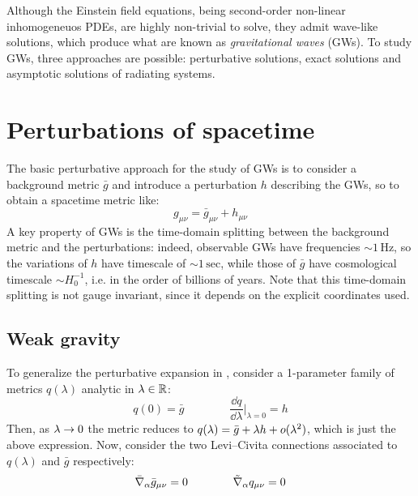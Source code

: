 
Although the Einstein field equations, being second-order non-linear inhomogeneuos PDEs, are highly non-trivial to solve, they admit wave-like solutions, which produce what are known as \emph{gravitational waves} (GWs). To study GWs, three approaches are possible: perturbative solutions, exact solutions and asymptotic solutions of radiating systems.

\section{Perturbations of spacetime}

The basic perturbative approach for the study of GWs is to consider a background metric $ \bar{g} $ and introduce a perturbation $ h $ describing the GWs, so to obtain a spacetime metric like:
\begin{equation}
  g_{\mu \nu} = \bar{g}_{\mu \nu} + h_{\mu \nu}
  \label{eq:gw-pert-exp}
\end{equation}
A key property of GWs is the time-domain splitting between the background metric and the perturbations: indeed, observable GWs have frequencies $ \sim 1 \,\text{Hz} $, so the variations of $ h $ have timescale of $ \sim 1 \,\text{sec} $, while those of $ \bar{g} $ have cosmological timescale $ \sim H_0^{-1} $, i.e. in the order of billions of years. Note that this time-domain splitting is not gauge invariant, since it depends on the explicit coordinates used.

\subsection{Weak gravity}
\label{ssec:weak-gravity}

To generalize the perturbative expansion in , consider a 1-parameter family of metrics $ q(\lambda) $ analytic in $ \lambda \in \mathbb{R} $:
\begin{equation*}
  q(0) = \bar{g}
  \qquad \qquad
  \frac{\dd q}{\dd \lambda} \bigg\vert_{\lambda = 0} = h
\end{equation*}
Then, as $ \lambda \rightarrow 0 $ the metric reduces to $ q(\lambda) = \bar{g} + \lambda h + o(\lambda^2) $, which is just the above expression. Now, consider the two Levi--Civita connections associated to $ q(\lambda) $ and $ \bar{g} $ respectively:
\begin{equation}
  \bar{\nabla}_\alpha \bar{g}_{\mu \nu} = 0
  \qquad \qquad
  \tilde{\nabla}_\alpha q_{\mu \nu} = 0
  \label{eq:perturbation-levi-civita}
\end{equation}

